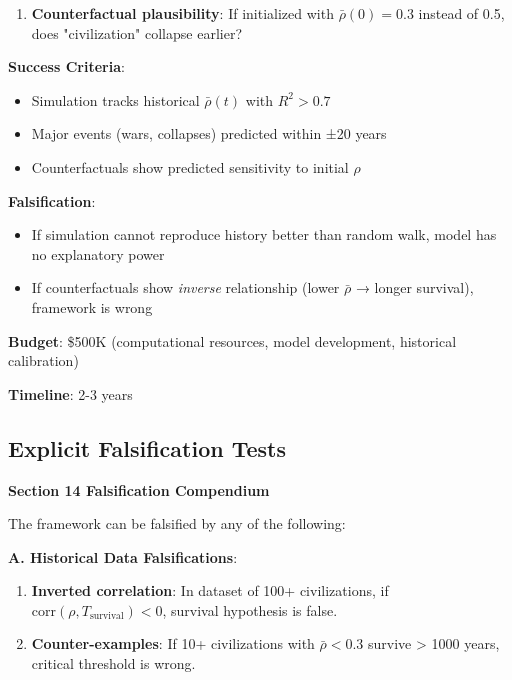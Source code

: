 \documentclass[11pt,a4paper]{article}
\theoremstyle{definition}
\theoremstyle{remark}
\begin{document}
\begin{small}
\begin{enumerate}
\begin{protocol}
\begin{enumerate}
    \item \textbf{Counterfactual plausibility}: If initialized with \(\bar{\rho}(0) = 0.3\) instead of 0.5, does "civilization" collapse earlier?
\end{enumerate}

\textbf{Success Criteria}:
\begin{itemize}
    \item Simulation tracks historical \(\bar{\rho}(t)\) with \(R^2 > 0.7\)
    \item Major events (wars, collapses) predicted within ±20 years
    \item Counterfactuals show predicted sensitivity to initial \(\rho\)
\end{itemize}

\textbf{Falsification}:
\begin{itemize}
    \item If simulation cannot reproduce history better than random walk, model has no explanatory power
    \item If counterfactuals show \textit{inverse} relationship (lower \(\bar{\rho}\) → longer survival), framework is wrong
\end{itemize}

\textbf{Budget}: \$500K (computational resources, model development, historical calibration)

\textbf{Timeline}: 2-3 years
\end{protocol}

\subsection{Explicit Falsification Tests}

\begin{mdframed}[backgroundcolor=red!10,linewidth=2pt,linecolor=red!70!black]
\textbf{Section 14 Falsification Compendium}

The framework can be falsified by any of the following:

\textbf{A. Historical Data Falsifications}:
\begin{enumerate}
    \item \textbf{Inverted correlation}: In dataset of 100+ civilizations, if \(\text{corr}(\rho, T_{\text{survival}}) < 0\), survival hypothesis is false.
    
    \item \textbf{Counter-examples}: If 10+ civilizations with \(\bar{\rho} < 0.3\) survive > 1000 years, critical threshold is wrong.
    

\end{enumerate}
\end{mdframed}
\end{enumerate}
\end{small}
\end{document}
